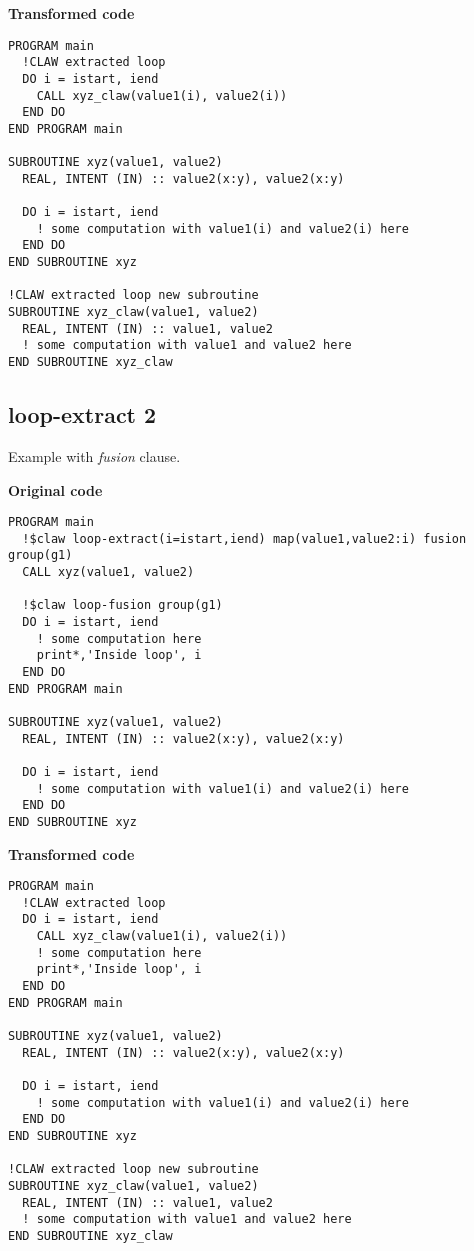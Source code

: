 \documentclass{article}
\begin{document}
\textbf{Transformed code}
\begin{lstlisting}
PROGRAM main
  !CLAW extracted loop
  DO i = istart, iend
    CALL xyz_claw(value1(i), value2(i))
  END DO
END PROGRAM main

SUBROUTINE xyz(value1, value2)
  REAL, INTENT (IN) :: value2(x:y), value2(x:y)

  DO i = istart, iend
    ! some computation with value1(i) and value2(i) here
  END DO
END SUBROUTINE xyz

!CLAW extracted loop new subroutine
SUBROUTINE xyz_claw(value1, value2)
  REAL, INTENT (IN) :: value1, value2
  ! some computation with value1 and value2 here
END SUBROUTINE xyz_claw
\end{lstlisting}

\subsection{loop-extract 2}
\label{loop-extract2}
Example with \textit{fusion} clause. 

\textbf{Original code}
\begin{lstlisting}
PROGRAM main
  !$claw loop-extract(i=istart,iend) map(value1,value2:i) fusion group(g1)
  CALL xyz(value1, value2)

  !$claw loop-fusion group(g1)
  DO i = istart, iend
    ! some computation here
    print*,'Inside loop', i
  END DO
END PROGRAM main

SUBROUTINE xyz(value1, value2)
  REAL, INTENT (IN) :: value2(x:y), value2(x:y)

  DO i = istart, iend
    ! some computation with value1(i) and value2(i) here
  END DO
END SUBROUTINE xyz
\end{lstlisting}

\textbf{Transformed code}
\begin{lstlisting}
PROGRAM main
  !CLAW extracted loop
  DO i = istart, iend
    CALL xyz_claw(value1(i), value2(i))
    ! some computation here
    print*,'Inside loop', i
  END DO
END PROGRAM main

SUBROUTINE xyz(value1, value2)
  REAL, INTENT (IN) :: value2(x:y), value2(x:y)

  DO i = istart, iend
    ! some computation with value1(i) and value2(i) here
  END DO
END SUBROUTINE xyz

!CLAW extracted loop new subroutine
SUBROUTINE xyz_claw(value1, value2)
  REAL, INTENT (IN) :: value1, value2
  ! some computation with value1 and value2 here
END SUBROUTINE xyz_claw
\end{lstlisting}
\end{document}
